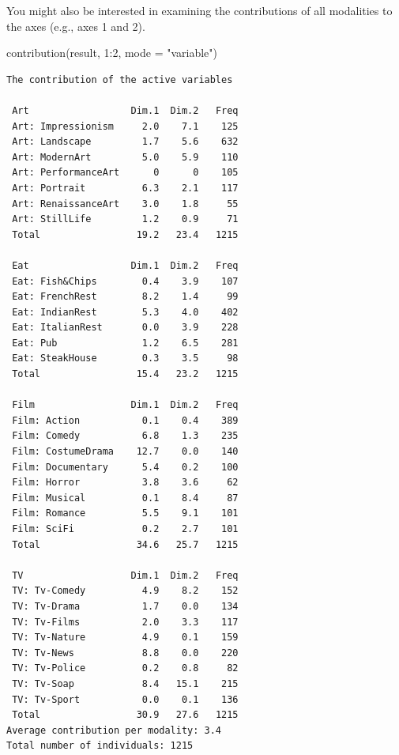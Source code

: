 \documentclass[
  letterpaper,
  DIV=11,
  numbers=noendperiod]{scrartcl}
\newenvironment{Shaded}{\begin{snugshade}}{\end{snugshade}}
\newcommand{\AttributeTok}[1]{\textcolor[rgb]{0.40,0.45,0.13}{#1}}
\newcommand{\DecValTok}[1]{\textcolor[rgb]{0.68,0.00,0.00}{#1}}
\newcommand{\FunctionTok}[1]{\textcolor[rgb]{0.28,0.35,0.67}{#1}}
\newcommand{\NormalTok}[1]{\textcolor[rgb]{0.00,0.23,0.31}{#1}}
\newcommand{\SpecialCharTok}[1]{\textcolor[rgb]{0.37,0.37,0.37}{#1}}
\newcommand{\StringTok}[1]{\textcolor[rgb]{0.13,0.47,0.30}{#1}}
\begin{document}
\normalsize

You might also be interested in examining the contributions of all
modalities to the axes (e.g., axes 1 and 2).

\scriptsize

\begin{Shaded}
\begin{Highlighting}[]
\FunctionTok{contribution}\NormalTok{(result, }\DecValTok{1}\SpecialCharTok{:}\DecValTok{2}\NormalTok{, }\AttributeTok{mode =} \StringTok{"variable"}\NormalTok{)}
\end{Highlighting}
\end{Shaded}

\begin{verbatim}
The contribution of the active variables
 
 Art                  Dim.1  Dim.2   Freq
 Art: Impressionism     2.0    7.1    125
 Art: Landscape         1.7    5.6    632
 Art: ModernArt         5.0    5.9    110
 Art: PerformanceArt      0      0    105
 Art: Portrait          6.3    2.1    117
 Art: RenaissanceArt    3.0    1.8     55
 Art: StillLife         1.2    0.9     71
 Total                 19.2   23.4   1215
 
 Eat                  Dim.1  Dim.2   Freq
 Eat: Fish&Chips        0.4    3.9    107
 Eat: FrenchRest        8.2    1.4     99
 Eat: IndianRest        5.3    4.0    402
 Eat: ItalianRest       0.0    3.9    228
 Eat: Pub               1.2    6.5    281
 Eat: SteakHouse        0.3    3.5     98
 Total                 15.4   23.2   1215
 
 Film                 Dim.1  Dim.2   Freq
 Film: Action           0.1    0.4    389
 Film: Comedy           6.8    1.3    235
 Film: CostumeDrama    12.7    0.0    140
 Film: Documentary      5.4    0.2    100
 Film: Horror           3.8    3.6     62
 Film: Musical          0.1    8.4     87
 Film: Romance          5.5    9.1    101
 Film: SciFi            0.2    2.7    101
 Total                 34.6   25.7   1215
 
 TV                   Dim.1  Dim.2   Freq
 TV: Tv-Comedy          4.9    8.2    152
 TV: Tv-Drama           1.7    0.0    134
 TV: Tv-Films           2.0    3.3    117
 TV: Tv-Nature          4.9    0.1    159
 TV: Tv-News            8.8    0.0    220
 TV: Tv-Police          0.2    0.8     82
 TV: Tv-Soap            8.4   15.1    215
 TV: Tv-Sport           0.0    0.1    136
 Total                 30.9   27.6   1215
Average contribution per modality: 3.4
Total number of individuals: 1215
\end{verbatim}
\end{document}
